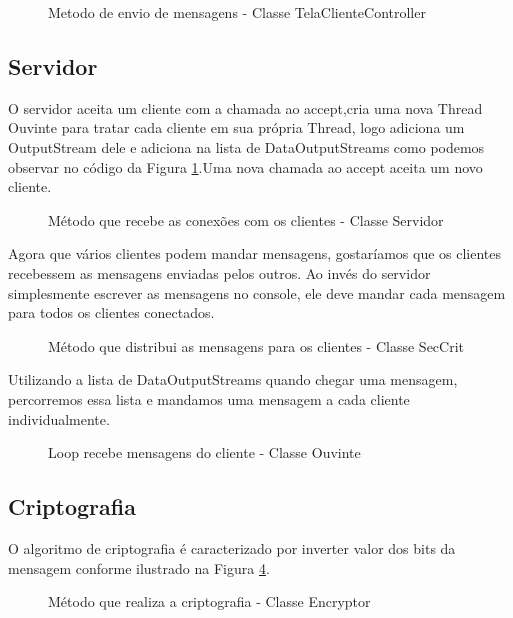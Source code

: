 \documentclass[a4paper,12pt]{article}
\begin{document}
\begin{figure}[H]

\caption{Metodo de envio de mensagens - Classe TelaClienteController}
\end{figure}

\subsection{Servidor}
O servidor aceita um cliente com a chamada ao accept,cria uma nova Thread Ouvinte para tratar cada cliente em sua própria Thread, logo adiciona um OutputStream dele e adiciona na lista de DataOutputStreams como podemos observar no código da Figura \ref{fig7}.Uma nova chamada ao accept aceita um novo cliente.
\begin{figure}[H]

\caption{Método que recebe as conexões com os clientes - Classe Servidor}
\label{fig7}
\end{figure}
Agora que vários clientes podem mandar mensagens, gostaríamos que os clientes recebessem as mensagens enviadas pelos outros. Ao invés do servidor simplesmente escrever as mensagens no console, ele deve mandar cada mensagem para todos os clientes conectados.
\begin{figure}[H]
	
	\caption{Método que distribui as mensagens para os clientes - Classe SecCrit}
	\label{fig8}
\end{figure}

Utilizando a lista de DataOutputStreams quando chegar uma mensagem, percorremos essa lista e mandamos uma mensagem a cada cliente individualmente.
\begin{figure}[H]

\caption{Loop recebe mensagens do cliente - Classe Ouvinte}
\label{fig10}
\end{figure}


\subsection{Criptografia}
O algoritmo de criptografia é caracterizado por inverter valor dos bits da mensagem conforme ilustrado na Figura \ref{fig9}.
\begin{figure}[H]

\caption{Método que realiza a criptografia - Classe Encryptor}
\label{fig9}
\end{figure}
\end{document}
